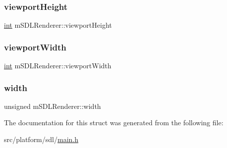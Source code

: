 \subsubsection{\texorpdfstring{viewport\+Height}{viewportHeight}}
{\footnotesize\ttfamily \mbox{\hyperlink{ioapi_8h_a787fa3cf048117ba7123753c1e74fcd6}{int}} m\+S\+D\+L\+Renderer\+::viewport\+Height}

\mbox{\label{structm_s_d_l_renderer_a0a2d83dd890f12b471db8b60dc40da59}} 
\subsubsection{\texorpdfstring{viewport\+Width}{viewportWidth}}
{\footnotesize\ttfamily \mbox{\hyperlink{ioapi_8h_a787fa3cf048117ba7123753c1e74fcd6}{int}} m\+S\+D\+L\+Renderer\+::viewport\+Width}

\mbox{\label{structm_s_d_l_renderer_a768f7abe0f1134a8896dce5e86cb8241}} 
\subsubsection{\texorpdfstring{width}{width}}
{\footnotesize\ttfamily unsigned m\+S\+D\+L\+Renderer\+::width}



The documentation for this struct was generated from the following file\+:\begin{DoxyCompactItemize}
\item 
src/platform/sdl/\mbox{\hyperlink{main_8h}{main.\+h}}\end{DoxyCompactItemize}
